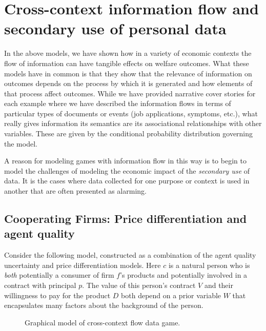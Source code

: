 \documentclass[../thesis.tex]{subfiles}
\begin{document}
\section{Cross-context information flow and secondary use of personal data}
\label{sec:cross-context}

In the above models, we have shown how in
a variety of economic contexts the flow of information
can have tangible effects on welfare outcomes.
What these models have in common is that they show
that the relevance of information on outcomes depends
on the process by which it is generated and how
elements of that process affect outcomes.
While we have provided narrative cover stories for
each example where we have described the information
flows in terms of particular types of documents or events
(job applications, symptoms, etc.), what really gives
information its semantics are its associational
relationships with other variables.
These are given by the conditional probability
distribution governing the model.

A reason for modeling games with information flow in
this way is to begin to model the challenges of modeling
the economic impact of the \emph{secondary use} of data.
It is the cases where data collected for one purpose or context
is used in another that are often presented as alarming.

\subsection{Cooperating Firms: Price differentiation and agent quality}
\label{sec:cooperating-firms}

Consider the following model, constructed as a combination
of the agent quality uncertainty and price differentiation
models.
Here $c$ is a natural person who is \emph{both} potentially
a consumer of firm $f$'s products and potentially involved
in a contract with principal $p$.
The value of this person's contract $V$ and their
willingness to pay for the product $D$ both depend on
a prior variable $W$ that encapsulates many factors about
the background of the person.

\begin{figure}
\begin{center}
\end{center}
\caption{Graphical model of cross-context flow data game.}
\end{figure}
\end{document}
